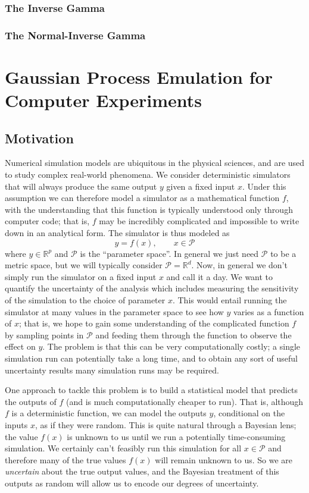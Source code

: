 \documentclass[12pt]{article}
\newcommand{\R}{\mathcal{R}}
\def\R{\mathbb{R}}
\begin{document}
\subsubsection{The Inverse Gamma}

\subsubsection{The Normal-Inverse Gamma}


\section{Gaussian Process Emulation for Computer Experiments}

\subsection{Motivation}
Numerical simulation models are ubiquitous in the physical sciences, and are used to study complex real-world phenomena. We consider 
deterministic simulators that will always produce the same output $y$ given a fixed input $x$. Under this assumption we can therefore model 
a simulator as a mathematical function $f$, with the understanding that this function is typically understood only through computer code; that is, 
$f$ may be incredibly complicated and impossible to write down in an analytical form. The simulator is thus modeled as 
\[y = f(x), \qquad x \in \mathcal{P}\]
where $y \in \R^p$ and $\mathcal{P}$ is the ``parameter space''. In general we just need $\mathcal{P}$ to be a metric space, but we will typically 
consider $\mathcal{P} = \R^d$. Now, in general we don't simply run the simulator on a fixed input $x$ and call it a day. We want to quantify the uncertainty 
of the analysis which includes measuring the sensitivity of the simulation to the choice of parameter $x$. This would entail running the simulator at many 
values in the parameter space to see how $y$ varies as a function of $x$; that is, we hope to gain some understanding of the complicated function $f$ by 
sampling points in $\mathcal{P}$ and feeding them through the function to observe the effect on $y$. The problem is that this can be very computationally costly; 
a single simulation run can potentially take a long time, and to obtain any sort of useful uncertainty results many simulation runs may be required. 

One approach to tackle this problem is to build a statistical model that predicts the outputs of $f$ (and is much computationally cheaper to run). That is, although $f$ 
is a deterministic function, we can model the outputs $y$, conditional on the inputs $x$, as if they were random. This is quite natural through a Bayesian lens; the value 
$f(x)$ is unknown to us until we run a potentially time-consuming simulation. We certainly can't feasibly run this simulation for all $x \in \mathcal{P}$ and therefore many 
of the true values $f(x)$ will remain unknown to us. So we are \textit{uncertain} about the true output values, and the Bayesian treatment of this outputs as random will
allow us to encode our degrees of uncertainty. 
\end{document}
